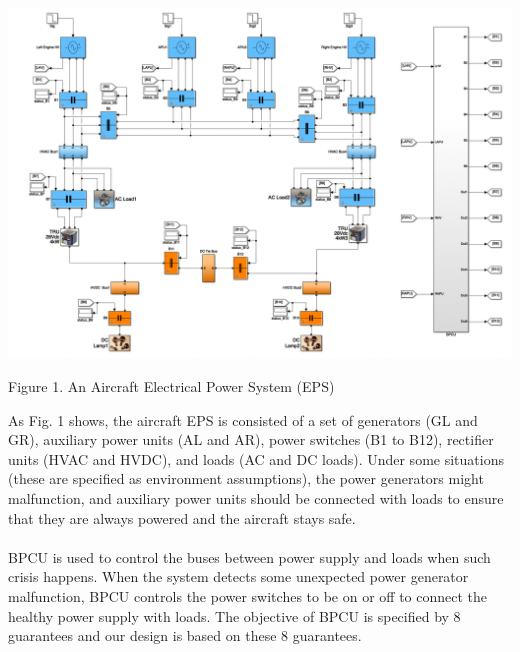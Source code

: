 \documentclass{mcmthesis}
\begin{document}
\begin{center}
\includegraphics[width=15cm]{fig1.png}
\end{center}
\begin{center}
\small{Figure 1.  An Aircraft Electrical Power System (EPS)}
\end{center}
As Fig. 1 shows, the aircraft EPS is consisted of a set of generators (GL and GR),  auxiliary power units (AL and AR),  power switches (B1 to B12),  rectifier units (HVAC and HVDC), and loads (AC and DC loads). Under some situations (these are specified as environment assumptions), the power generators might malfunction, and auxiliary power units should be connected with loads to ensure that they are always powered and the aircraft stays safe. 
\\ 
\\
BPCU is used to control the buses between power supply and loads when such crisis happens. When the system detects some unexpected power generator malfunction, BPCU controls the power switches to be on or off to connect the healthy power supply with loads. The objective of BPCU is specified by 8 guarantees and our design is based on these 8 guarantees.
\end{document}
